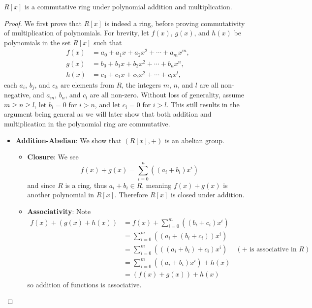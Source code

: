 \begin{proposition}
    $R[x]$ is a commutative ring under polynomial addition and multiplication.
\end{proposition}
\begin{proof}
    We first prove that $R[x]$ is indeed a ring, before proving commutativity of multiplication of polynomials. For brevity, let $f(x)$, $g(x)$, and $h(x)$ be polynomials in the set $R[x]$ such that
    \begin{align*}
        f(x) &= a_0 + a_1x + a_2x^2 + \cdots + a_mx^m,\\
        g(x) &= b_0 + b_1x + b_2x^2 + \cdots + b_nx^n,\\
        h(x) &= c_0 + c_1x + c_2x^2 + \cdots + c_lx^l,
    \end{align*}
    each $a_i$, $b_j$, and $c_k$ are elements from $R$, the integers $m$, $n$, and $l$ are all non-negative, and $a_m$, $b_n$, and $c_l$ are all non-zero. Without loss of generality, assume $m \geq n \geq l$, let $b_i = 0$ for $i > n$, and let $c_i = 0$ for $i > l$. This still results in the argument being general as we will later show that both addition and multiplication in the polynomial ring are commutative.
    \begin{itemize}
        \item \textbf{Addition-Abelian}: We show that $(R[x], +)$ is an abelian group.
        \begin{itemize}
            \item \textbf{Closure}: We see
            \[
                f(x) + g(x) = \sum_{i=0}^n\left((a_i+b_i)x^i\right)
            \]
            and since $R$ is a ring, thus $a_i+b_i \in R$, meaning $f(x) + g(x)$ is another polynomial in $R[x]$. Therefore $R[x]$ is closed under addition.
            
            \item \textbf{Associativity}: Note
            \begin{align*}
                f(x) + (g(x) + h(x)) &= f(x) + \sum_{i=0}^m\left((b_i+c_i)x^i\right)\\
                &= \sum_{i=0}^m\left((a_i + (b_i + c_i))x^i\right)\\
                &= \sum_{i=0}^m\left(((a_i + b_i) + c_i)x^i\right) & (+ \text{ is associative in }R)\\
                &= \sum_{i=0}^m\left((a_i+b_i)x^i\right) + h(x)\\
                &= (f(x) + g(x)) + h(x)
            \end{align*}
            so addition of functions is associative.
            

\end{itemize}
\end{itemize}
\end{proof}

